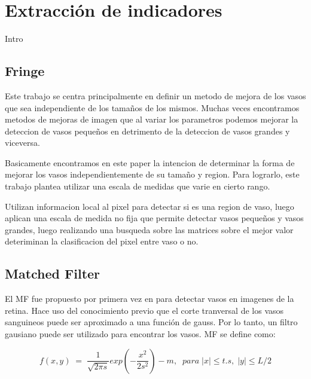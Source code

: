 \section{Extracci\'on de indicadores}

Intro

\subsection{Fringe}


Este trabajo se centra principalmente en definir un m\’etodo de mejora de los vasos que sea independiente de los tamaños de los mismos. Muchas veces encontramos m\’etodos de mejoras de imagen que al variar los parametros podemos mejorar la detecci\’on de vasos pequeños en detrimento de la detecci\’on de vasos grandes y viceversa.

B\’asicamente encontramos en este paper la intenci\’on de determinar la forma de mejorar los vasos independientemente de su tamaño y regi\’on. Para lograrlo, este trabajo plantea utilizar una escala de medidas que var\’ie en cierto rango.

Utilizan informacion local al pixel para detectar si es una region de vaso, luego aplican una escala de medida no fija que permite detectar vasos pequeños y vasos grandes, luego realizando una busqueda sobre las matrices sobre el mejor valor deteriminan la clasificacion del pixel entre vaso o no.

\subsection{Matched Filter}

El MF fue propuesto por primera vez en \cite{chaudhuri1989detection} para detectar vasos en imagenes de la retina. Hace uso del conocimiento previo que el corte tranversal de los vasos sanguineos puede ser aproximado a una función de gauss. Por lo tanto, un filtro gausiano puede ser utilizado para encontrar los vasos. MF se define como: 

\begin{displaymath}
f(x,y)\;=\;\frac1{\sqrt{2\pi s}}exp(-\frac{x^2}{2s^2})-m,\;\;para\;\left|x\right|\leq t.s,\;\left|y\right|\leq L/2
\end{displaymath}

